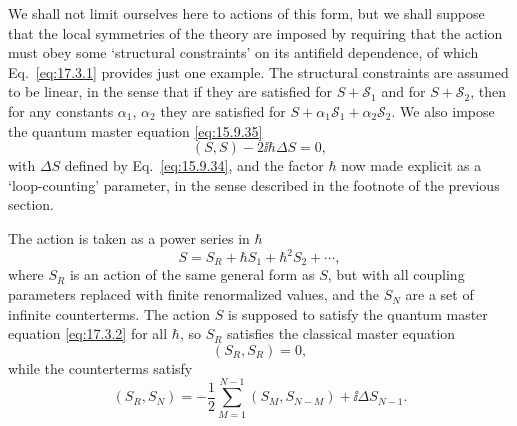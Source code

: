 We shall not limit ourselves here to actions of this form, but we shall
suppose that the local symmetries of the theory are imposed by requiring
that the action must obey some `structural constraints' on its antifield
dependence, of which Eq.~\eqref{eq:17.3.1} provides just one example. The
structural constraints are assumed to be linear, in the sense that if they
are satisfied for $S+\mathcal S_1$ and for $S+\mathcal S_2$, then for any
constants $\alpha_1$, $\alpha_2$ they are satisfied for
$S+\alpha_1\mathcal S_1+\alpha_2\mathcal S_2$. We also impose the quantum
master equation \eqref{eq:15.9.35}
\begin{equation}
(S,S)-2\ii\hbar\Delta S=0,
\label{eq:17.3.2}
\end{equation}
with $\Delta S$ defined by Eq.~\eqref{eq:15.9.34}, and the factor $\hbar$ now made
explicit as a `loop-counting' parameter, in the sense described in the
footnote of the previous section.

The action is taken as a power series in $\hbar$
\begin{equation}
S=S_R+\hbar S_1+\hbar^2S_2+\cdots,
\label{eq:17.3.3}
\end{equation}
where $S_R$ is an action of the same general form as $S$, but with all
coupling parameters replaced with finite renormalized values, and the $S_N$
are a set of infinite counterterms. The action $S$ is supposed to satisfy
the quantum master equation \eqref{eq:17.3.2} for all $\hbar$, so $S_R$
satisfies the classical master equation
\begin{equation}
(S_R,S_R)=0,
\label{eq:17.3.4}
\end{equation}
while the counterterms satisfy
\begin{equation}
(S_R,S_N)=-\frac12\sum_{M=1}^{N-1}(S_M,S_{N-M})+\ii\Delta S_{N-1}.
\label{eq:17.3.5}
\end{equation}

